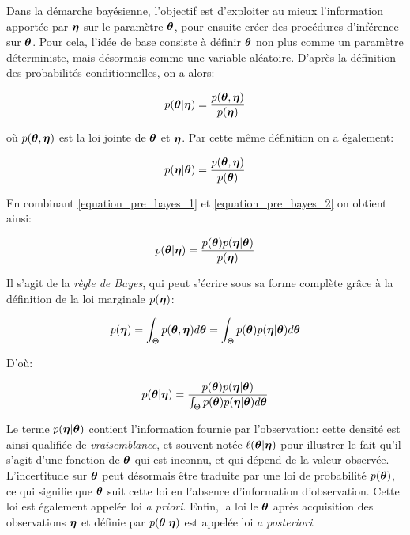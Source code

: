 	Dans la démarche bayésienne, l'objectif est d'exploiter au mieux l'information apportée par ${\bm{\eta}}$ sur le paramètre ${\bm{\theta}}$, pour ensuite créer des procédures d'inférence sur ${\bm{\theta}}$. Pour cela, l'idée de base consiste à définir ${\bm{\theta}}$ non plus comme un paramètre déterministe, mais désormais comme une variable aléatoire. D'après la définition des probabilités conditionnelles, on a alors:
	
	\begin{equation}
		p({\bm{\theta}} | {\bm{\eta}}) = \dfrac{p({\bm{\theta}}, {\bm{\eta}})}{p({\bm{\eta}})}
		\label{equation_pre_bayes_1}
	\end{equation}
	
	où $p({\bm{\theta}}, {\bm{\eta}})$ est la loi jointe de ${\bm{\theta}}$ et ${\bm{\eta}}$. Par cette même définition on a également:
	
	\begin{equation}
		p({\bm{\eta}} | {\bm{\theta}}) =  \dfrac{p({\bm{\theta}}, {\bm{\eta}})}{p({\bm{\theta}})}
		\label{equation_pre_bayes_2}
	\end{equation}
	
	En combinant \eqref{equation_pre_bayes_1} et \eqref{equation_pre_bayes_2} on obtient ainsi:
	
	\begin{equation}
		p({\bm{\theta}} | {\bm{\eta}}) = \dfrac{p({\bm{\theta}})p({\bm{\eta}} | {\bm{\theta}})}{p({\bm{\eta}})}
		\label{eq_bayes_simple}
	\end{equation}
	
	Il s'agit de la \textit{règle de Bayes}, qui peut s'écrire sous sa forme complète grâce à la définition de la loi marginale $p({\bm{\eta}})$:
	
	\begin{equation}
		p({\bm{\eta}}) = \int_{\Theta} p({\bm{\theta}},{\bm{\eta}})d{\bm{\theta}} = \int_{\Theta} p({\bm{\theta}})p({\bm{\eta}}|{\bm{\theta}})d{\bm{\theta}}
		\label{eq_definition_marginale_d}
	\end{equation}
	
	D'où:

	\begin{equation}
	p({\bm{\theta}} | {\bm{\eta}}) = \dfrac{p({\bm{\theta}})p({\bm{\eta}} | {\bm{\theta}})}{ \int_{\Theta} p({\bm{\theta}})p({\bm{\eta}}|{\bm{\theta}})d{\bm{\theta}}}
	\label{eq_bayes_simple}
	\end{equation}
	
	Le terme $p({\bm{\eta}}|{\bm{\theta}})$ contient l'information fournie par l'observation: cette densité est ainsi qualifiée de \textit{vraisemblance}, et souvent notée $\ell({\bm{\theta}} |{\bm{\eta}})$ pour illustrer le fait qu'il s'agit d'une fonction de ${\bm{\theta}}$ qui est inconnu, et qui dépend de la valeur observée. 
	L'incertitude sur ${\bm{\theta}}$ peut désormais être traduite par une loi de probabilité $p({\bm{\theta}})$, ce qui signifie que ${\bm{\theta}}$ suit cette loi en l'absence d'information d'observation. Cette loi est également appelée loi  \textit{a priori}. 
	Enfin, la loi le ${\bm{\theta}}$ après acquisition des observations ${\bm{\eta}}$ et définie par  	$p({\bm{\theta}} | {\bm{\eta}})$ est appelée loi \textit{a posteriori}.\\
	
